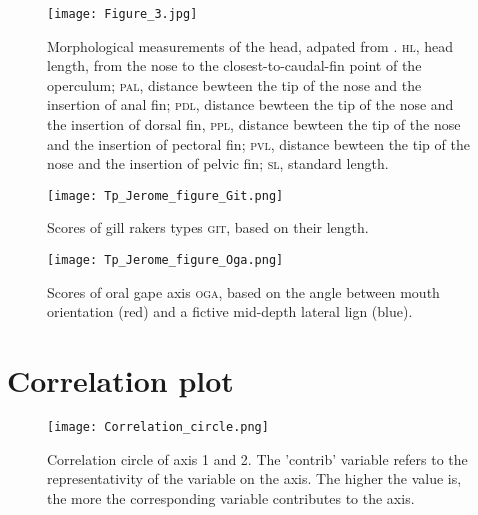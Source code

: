 \begin{figure} [!htbp]
	\begin{center}
		\texttt{[image: Figure\_3.jpg]}
		\caption[Petite légende]{Morphological measurements of the head, adpated from \citet{keat-chuanng2017,habib2019}. \textsc{hl}, head length, from the nose to the closest-to-caudal-fin point of the operculum; \textsc{pal}, distance bewteen the tip of the nose and the insertion of anal fin; \textsc{pdl}, distance bewteen the tip of the nose and the insertion of dorsal fin, \textsc{ppl}, distance bewteen the tip of the nose and the insertion of pectoral fin; \textsc{pvl}, distance bewteen the tip of the nose and the insertion of pelvic fin;  \textsc{sl}, standard length.}
		\label{fig:fin}
	\end{center}
	
\end{figure}


\begin{figure} [!htbp]
	\begin{center}
	\begin{minipage}{0.45\textwidth}
		\centering
		\texttt{[image: Tp\_Jerome\_figure\_Git.png]}
		\caption[Petite légende]{Scores of gill rakers types \textsc{git}, based on their length.}
		\label{fig:git}
	\end{minipage}\hfill
	\begin{minipage}{0.45\textwidth}
		\centering
		\texttt{[image: Tp\_Jerome\_figure\_Oga.png]}
		\caption[Petite légende]{Scores of oral gape axis \textsc{oga}, based on the angle between mouth orientation (red) and a fictive mid-depth lateral lign (blue).}
		\label{fig:oga}
	\end{minipage}
	\end{center}
	
\end{figure}

\section{Correlation plot}
\begin{figure} [!htbp]
	\begin{center}
		\texttt{[image: Correlation\_circle.png]}
	\end{center}
	\caption{Correlation circle of axis 1 and 2. The 'contrib' variable refers to the representativity of the variable on the axis. The higher the value is, the more the corresponding variable contributes to the axis.}
	\label{fig:corr_circ_12}
\end{figure}

